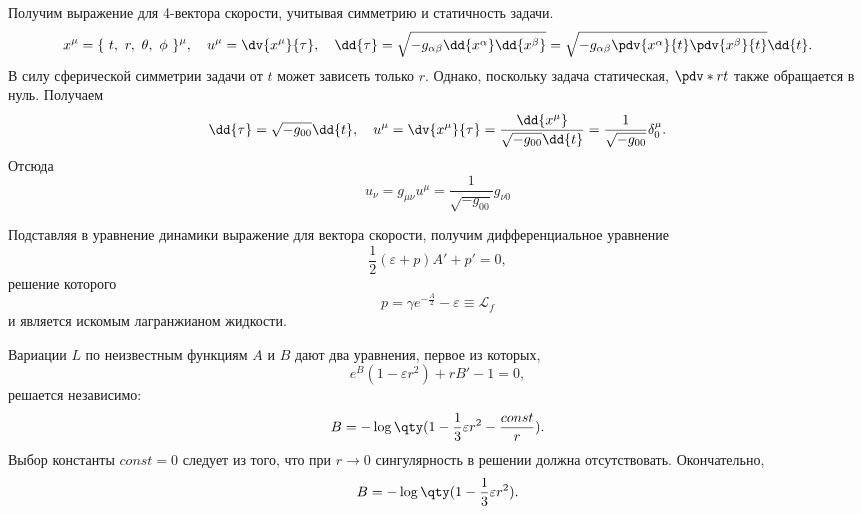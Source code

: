 \documentclass[\docroot/reports/draft/report.tex]{subfiles}
\begin{document}
    Получим выражение для 4-вектора скорости, учитывая симметрию и статичность задачи.
    \begin{equation*}
        x^\mu = \{\ t,\ r,\ \theta,\ \phi \ \}^\mu , \quad
        u^\mu = \dv{x^\mu}{\tau} , \quad
        \dd{\tau} = \sqrt{ - g_{\alpha\beta} \dd{x^\alpha} \dd{x^\beta} }
                  = \sqrt{ - g_{\alpha\beta} \pdv{x^\alpha}{t} \pdv{x^\beta}{t} } \dd{t} .
    \end{equation*}
    В силу сферической симметрии задачи от $t$ может зависеть только $r$. Однако, поскольку задача статическая, $\pdv*{r}{t}$ также обращается в нуль. Получаем
    \begin{equation*}
        \dd{\tau} = \sqrt{ - g_{00} } \dd{t} , \quad
        u^\mu = \dv{x^\mu}{\tau}
              = \frac{\dd{x^\mu}}{\sqrt{- g_{00}} \dd{t}}
              = \frac{1}{\sqrt{- g_{00}}} \delta^\mu_0 .
    \end{equation*}
    Отсюда
    \begin{equation*}
        u_\nu = g_{\mu\nu} u^\mu = \frac{1}{\sqrt{- g_{00}}} g_{\nu 0}
    \end{equation*}

    Подставляя в уравнение динамики выражение для вектора скорости, получим дифференциальное уравнение
    \begin{equation*}
        \frac{1}{2} (\varepsilon + p) A' + p' = 0 ,
    \end{equation*}
    решение которого
    \begin{equation*}
        p = \gamma e^{-\frac{A}{2}} - \varepsilon \equiv \mathcal{L}_f
    \end{equation*}
    и является искомым лагранжианом жидкости.

    Вариации $L$ по неизвестным функциям $A$ и $B$ дают два уравнения, первое из которых,
    \begin{equation*}
        e^B (1 - \varepsilon r^2) + r B' - 1 = 0 ,
    \end{equation*}
    решается независимо:
    \begin{equation*}
        B = - \log\qty(1 - \frac{1}{3} \varepsilon r^2 - \frac{const}{r}) .
    \end{equation*}
    Выбор константы $const = 0$ следует из того, что при $r \to 0$ сингулярность в решении должна отсутствовать. Окончательно,
    \begin{equation*}
        B = - \log\qty(1 - \frac{1}{3} \varepsilon r^2) .
    \end{equation*}
\end{document}

